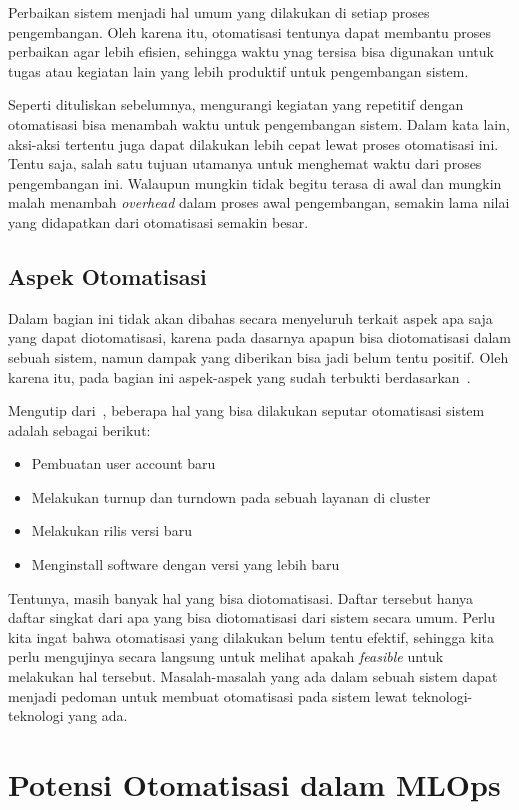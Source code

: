 Perbaikan sistem menjadi hal umum yang dilakukan di setiap proses pengembangan. Oleh karena itu, otomatisasi tentunya dapat membantu proses perbaikan agar lebih efisien, sehingga waktu ynag tersisa bisa digunakan untuk tugas atau kegiatan lain yang lebih produktif untuk pengembangan sistem.

Seperti dituliskan sebelumnya, mengurangi kegiatan yang repetitif dengan otomatisasi bisa menambah waktu untuk pengembangan sistem. Dalam kata lain, aksi-aksi tertentu juga dapat dilakukan lebih cepat lewat proses otomatisasi ini. Tentu saja, salah satu tujuan utamanya untuk menghemat waktu dari proses pengembangan ini. Walaupun mungkin tidak begitu terasa di awal dan mungkin malah menambah \textit{overhead} dalam proses awal pengembangan, semakin lama nilai yang didapatkan dari otomatisasi semakin besar.

\subsection{Aspek Otomatisasi}
Dalam bagian ini tidak akan dibahas secara menyeluruh terkait aspek apa saja yang dapat diotomatisasi, karena pada dasarnya apapun bisa diotomatisasi dalam sebuah sistem, namun dampak yang diberikan bisa jadi belum tentu positif. Oleh karena itu, pada bagian ini aspek-aspek yang sudah terbukti berdasarkan~\cite{beyer2016site}.

Mengutip dari~\cite{beyer2016site}, beberapa hal yang bisa dilakukan seputar otomatisasi sistem adalah sebagai berikut:
\begin{itemize}
  \item Pembuatan user account baru
  \item Melakukan turnup dan turndown pada sebuah layanan di cluster
  \item Melakukan rilis versi baru
  \item Menginstall software dengan versi yang lebih baru
\end{itemize}

Tentunya, masih banyak hal yang bisa diotomatisasi. Daftar tersebut hanya daftar singkat dari apa yang bisa diotomatisasi dari sistem secara umum. 
Perlu kita ingat bahwa otomatisasi yang dilakukan belum tentu efektif, sehingga kita perlu mengujinya secara langsung untuk melihat apakah \textit{feasible} untuk melakukan hal tersebut.
Masalah-masalah yang ada dalam sebuah sistem dapat menjadi pedoman untuk membuat otomatisasi pada sistem lewat teknologi-teknologi yang ada.

\section{Potensi Otomatisasi dalam MLOps}


